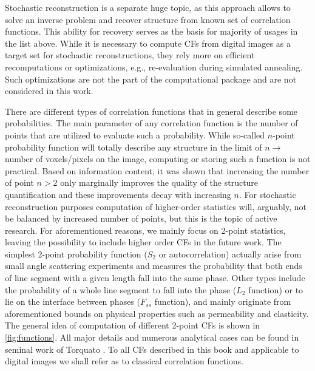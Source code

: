 \documentclass[reprint,amsmath,amssymb,aps,pre,nofootinbib]{revtex4-1}
\begin{document}
Stochastic reconstruction is a separate huge topic, as this approach allows to
solve an inverse problem and recover structure from known set of correlation
functions. This ability for recovery serves as the basis for majority of usages
in the list above. While it is necessary to compute CFs from digital images as a
target set for stochastic reconstructions, they rely more on efficient
recomputations or optimizations, e.g., re-evaluation during simulated
annealing. Such optimizations are not the part of the computational package and
are not considered in this work.

There are different types of correlation functions that in general describe some
probabilities. The main parameter of any correlation function is the number of
points that are utilized to evaluate such a probability. While so-called
$n$-point probability function\cite{Torq_book} will totally describe any
structure in the limit of $n \rightarrow$ number of voxels/pixels on the image,
computing or storing such a function is not practical. Based on information
content, it was shown that increasing the number of point $n > 2$ only
marginally improves the quality of the structure quantification and these
improvements decay with increasing $n$. For stochastic reconstruction purposes
computation of higher-order statistics will, arguably, not be balanced by
increased number of points, but this is the topic of active research. For
aforementioned reasons, we mainly focus on 2-point statistics, leaving the
possibility to include higher order CFs in the future work. The simplest 2-point
probability function ($S_2$ or autocorrelation) actually arise from small angle
scattering experiments and measures the probability that both ends of line
segment with a given length fall into the same phase. Other types include the
probability of a whole line segment to fall into the phase ($L_2$ function) or
to lie on the interface between phases ($F_{ss}$ function), and mainly originate
from aforementioned bounds on physical properties such as permeability and
elasticity. The general idea of computation of different 2-point CFs is shown in
\cref{fig:functions}. All major details and numerous analytical cases can be
found in seminal work of Torquato \cite{Torq_book}. To all CFs described in this
book and applicable to digital images we shall refer as to classical correlation
functions.
\end{document}
